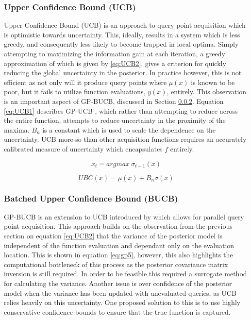 		\subsubsection{Upper Confidence Bound (UCB)}
			Upper Confidence Bound (UCB) is an approach to query point acquisition which is optimistic towards uncertainty. This, ideally, results in a system which is less greedy, and consequently less likely to become trapped in local optima. Simply attempting to maximizing the information gain at each iteration, a greedy approximation of which is given by \ref{eq:UCB2}, gives a criterion for quickly reducing the global uncertainty in the posterior. In practice however, this is not efficient as not only will it produce query points where \(\mu(x)\) is known to be poor, but it fails to utilize function evaluations, \(y(x)\), entirely. This observation is an important aspect of GP-BUCB, discussed in Section \ref{BUCB}. Equation \ref{eq:UCB1} describes GP-UCB \cite{GP-UCB}, which rather than attempting to reduce across the entire function, attempts to reduce uncertainty in the proximity of the maxima. \(B_n\) is a constant which is used to scale the dependence on the uncertainty. UCB more-so than other acquisition functions requires an accurately calibrated measure of uncertainty which encapsulates \(f\) entirely.



			\begin{equation}\label{eq:UCB2} x_t = argmax ~\sigma_{t-1}(x) \end{equation}


			\begin{equation}\label{eq:UCB1} UBC(x) = \mu(x) + B_n\sigma(x) \end{equation}




		\subsubsection{Batched Upper Confidence Bound (BUCB)}\label{BUCB}

		GP-BUCB is an extension to UCB introduced by \cite{GP-BUCB} which allows for parallel query point acquisition. This approach builds on the observation from the previous section on equation \ref{eq:UCB2} that the variance of the posterior model is independent of the function evaluation and dependant only on the evaluation location. This is shown in equation \ref{eq:gp5}, however, this also highlights the computational bottleneck of this process as the posterior covariance matrix inversion is still required. In order to be feasible this required a surrogate method for calculating the variance. Another issue is over confidence of the posterior model when the variance has been updated with unevaluated queries, as UCB relies heavily on this uncertainty. One proposed solution to this is to use highly conservative confidence bounds to ensure that the true function is captured.\cite{GP-BUCB}




